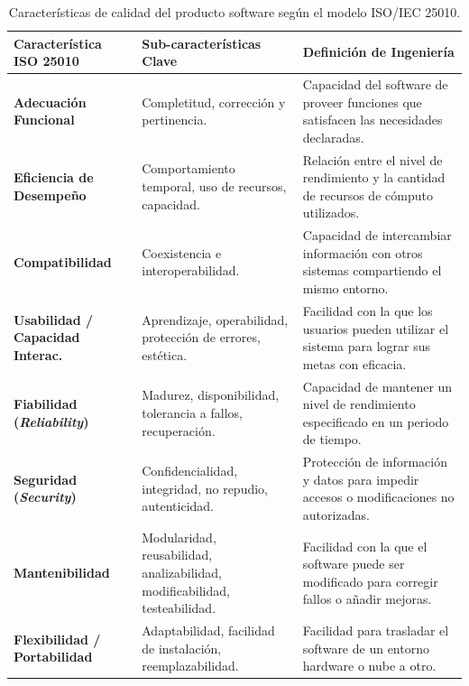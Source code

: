 \begin{table}[htbp]
\centering
\small
\begin{tabularx}{\textwidth}{l p{5cm} X}
\toprule
\textbf{Característica ISO 25010} & \textbf{Sub-características Clave} & \textbf{Definición de Ingeniería} \\
\midrule
\textbf{Adecuación Funcional} & Completitud, corrección y pertinencia. & Capacidad del software de proveer funciones que satisfacen las necesidades declaradas. \\
\addlinespace
\textbf{Eficiencia de Desempeño} & Comportamiento temporal, uso de recursos, capacidad. & Relación entre el nivel de rendimiento y la cantidad de recursos de cómputo utilizados. \\
\addlinespace
\textbf{Compatibilidad} & Coexistencia e interoperabilidad. & Capacidad de intercambiar información con otros sistemas compartiendo el mismo entorno. \\
\addlinespace
\textbf{Usabilidad / Capacidad Interac.} & Aprendizaje, operabilidad, protección de errores, estética. & Facilidad con la que los usuarios pueden utilizar el sistema para lograr sus metas con eficacia. \\
\addlinespace
\textbf{Fiabilidad (\emph{Reliability})} & Madurez, disponibilidad, tolerancia a fallos, recuperación. & Capacidad de mantener un nivel de rendimiento especificado en un periodo de tiempo. \\
\addlinespace
\textbf{Seguridad (\emph{Security})} & Confidencialidad, integridad, no repudio, autenticidad. & Protección de información y datos para impedir accesos o modificaciones no autorizadas. \\
\addlinespace
\textbf{Mantenibilidad} & Modularidad, reusabilidad, analizabilidad, modificabilidad, testeabilidad. & Facilidad con la que el software puede ser modificado para corregir fallos o añadir mejoras. \\
\addlinespace
\textbf{Flexibilidad / Portabilidad} & Adaptabilidad, facilidad de instalación, reemplazabilidad. & Facilidad para trasladar el software de un entorno hardware o nube a otro. \\
\bottomrule
\end{tabularx}
\caption{Características de calidad del producto software según el modelo ISO/IEC 25010.}
\label{tab:iso25010}
\end{table}

